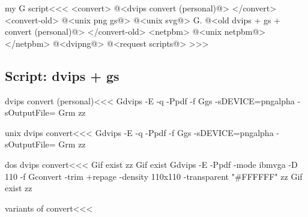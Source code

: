 \documentclass{article}
\begin{document}
\<my G script\><<<
 <convert>
@<dvips convert (personal)@>
 </convert>
<convert-old>
@<unix png gs@>
@<unix svg@>
G.
@<old dvips + gs + convert (personal)@> 
</convert-old>
<netpbm>
@<unix netpbm@>
</netpbm>
@<dvipng@>
@<request scripts@> %
>>>



\subsection{Script: dvips + gs}

\<dvips convert (personal)\><<<
Gdvips -E -q -Ppdf -f %
Ggs -sDEVICE=pngalpha -sOutputFile=%
Grm zz%

\<unix dvips convert\><<<
Gdvips -E -q -Ppdf -f %
Ggs -sDEVICE=pngalpha -sOutputFile=%
Grm zz%


\<dos dvips convert\><<<
Gif exist zz%
Gif exist %
Gdvips -E -Ppdf -mode ibmvga -D 110 -f %
Gconvert -trim +repage -density 110x110 -transparent "#FFFFFF" zz%
Gif exist zz%



\<variants of convert\><<<
\end{document}
